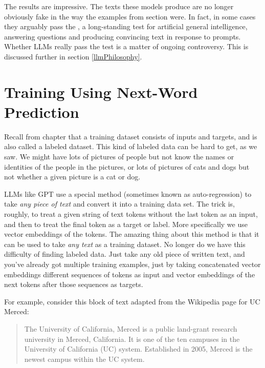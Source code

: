 The results are impressive. The texts these models produce are no longer obviously fake in the way the examples from section  were. In fact, in some cases they arguably pass the , a long-standing test for artificial general intelligence, answering questions and producing convincing  text in response to prompts. Whether LLMs really pass the test is a matter of ongoing controversy.  This is discussed further in section \ref{llmPhilosophy}.

\section{Training Using Next-Word Prediction}

Recall from chapter  that a training dataset consists of inputs and targets, and is also called a labeled dataset. This kind of labeled data can be hard to get, as we saw. We might have lots of pictures of people but not know the names or identities of the people in the pictures, or lots of pictures of cats and dogs but not whether a given picture is a cat or dog. 

LLMs like GPT use a special method (sometimes known as auto-regression) to take \emph{any piece of text} and convert it into a training data set. The trick is, roughly, to treat a given string of text tokens without the last token as an input, and then to treat the final token as a target or label. More specifically we use vector embeddings of the tokens. The amazing thing about this method is that it can be used to take \emph{any text} as a training dataset. No longer do we have this difficulty of finding labeled data. Just take any old piece of written text, and you've already got multiple training examples, just by taking concatenated vector embeddings different sequences of tokens as input and vector embeddings of the next tokens after those sequences as targets.

For example, consider this block of text adapted from the Wikipedia page for UC Merced:

\begin{quote}
The University of California, Merced is a public land-grant research university in Merced, California. It is one of the ten campuses in the University of California (UC) system. Established in 2005, Merced is the newest campus within the UC system.
\end{quote}

